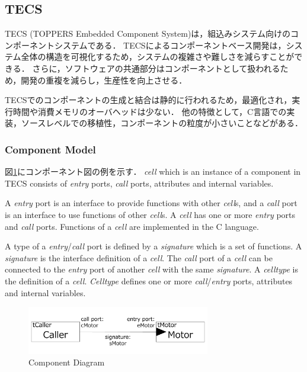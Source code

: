 \documentclass[submit]{ipsj_v2/UTF8/ipsj}
\begin{document}
\subsection{TECS}
TECS (TOPPERS Embedded Component System)は，組込みシステム向けのコンポーネントシステムである．
TECSによるコンポーネントベース開発は，システム全体の構造を可視化するため，システムの複雑さや難しさを減らすことができる．
さらに，ソフトウェアの共通部分はコンポーネントとして扱われるため，開発の重複を減らし，生産性を向上させる．

TECSでのコンポーネントの生成と結合は静的に行われるため，最適化され，実行時間や消費メモリのオーバヘッドは少ない．
他の特徴として，C言語での実装，ソースレベルでの移植性，コンポーネントの粒度が小さいことなどがある．

\subsubsection{Component Model}
図\ref{fig:component}にコンポーネント図の例を示す．
{\it cell} which is an instance of a component in TECS consists of {\it entry} ports, {\it call} ports, attributes and internal variables.

A {\it entry} port is an interface to provide functions with other {\it cell}s, and a {\it call} port is an interface to use functions of other {\it cell}s.
A {\it cell} has one or more {\it entry} ports and {\it call} ports.
Functions of a {\it cell} are implemented in the C language.

A type of a {\it entry}/{\it call} port is defined by a {\it signature} which is a set of functions.
A {\it signature} is the interface definition of a {\it cell}.
The {\it call} port of a {\it cell} can be connected to the {\it entry} port of another {\it cell} with the same {\it signature}.
A {\it celltype} is the definition of a {\it cell}.
{\it Celltype} defines one or more {\it call}/{\it entry} ports, attributes and internal variables.

\begin{figure}[t]
    \centering
    \includegraphics[width=8cm,clip]{../EMSOFT2016/figure/component_diagram.pdf}
    \caption{Component Diagram}
    \label{fig:component}
\end{figure}
\end{document}

